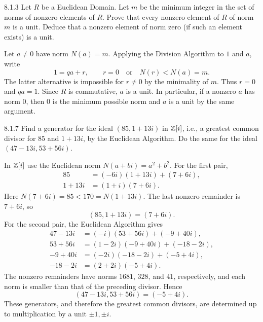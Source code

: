 \documentclass[11pt,oneside]{article}
\begin{document}

\begin{exercise}{8.1.3}
Let $R$ be a Euclidean Domain. Let $m$ be the minimum integer in the set of norms of nonzero elements of $R$. Prove that every nonzero element of $R$ of norm $m$ is a unit. Deduce that a nonzero element of norm zero (if such an element exists) is a unit.
\end{exercise}
\begin{solution}
Let $a\neq0$ have norm $N(a)=m$. Applying the Division Algorithm to $1$ and $a$, write
\[
1=qa+r,\qquad r=0\quad\text{or}\quad N(r)<N(a)=m.
\]
The latter alternative is impossible for $r\neq0$ by the minimality of $m$. Thus $r=0$ and $qa=1$. Since $R$ is commutative, $a$ is a unit. In particular, if a nonzero $a$ has norm $0$, then $0$ is the minimum possible norm and $a$ is a unit by the same argument.
\end{solution}

\begin{exercise}{8.1.7}
Find a generator for the ideal $(85,1+13i)$ in $\mathbb{Z}[i]$, i.e., a greatest common divisor for $85$ and $1+13i$, by the Euclidean Algorithm. Do the same for the ideal $(47-13i,53+56i)$.
\end{exercise}
\begin{solution}
In $\mathbb{Z}[i]$ use the Euclidean norm $N(a+bi)=a^2+b^2$. For the first pair,
\[
\begin{aligned}
85&=(-6i)(1+13i)+(7+6i),\\
1+13i&=(1+i)(7+6i).
\end{aligned}
\]
Here $N(7+6i)=85<170=N(1+13i)$. The last nonzero remainder is $7+6i$, so
\[
(85,1+13i)=(7+6i).
\]
For the second pair, the Euclidean Algorithm gives
\[
\begin{aligned}
47-13i&=(-i)(53+56i)+(-9+40i),\\
53+56i&=(1-2i)(-9+40i)+(-18-2i),\\
-9+40i&=(-2i)(-18-2i)+(-5+4i),\\
-18-2i&=(2+2i)(-5+4i).
\end{aligned}
\]
The nonzero remainders have norms $1681$, $328$, and $41$, respectively, and each norm is smaller than that of the preceding divisor. Hence
\[
(47-13i,53+56i)=(-5+4i).
\]
These generators, and therefore the greatest common divisors, are determined up to multiplication by a unit $\pm1,\pm i$.
\end{solution}
\end{document}

